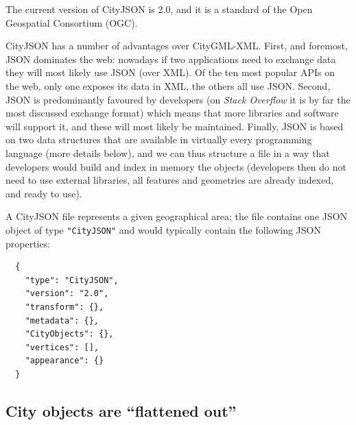 %

The current version of CityJSON is 2.0, and it is a standard of the Open Geospatial Consortium (OGC).

%

CityJSON has a number of advantages over CityGML-XML\@.
First, and foremost, JSON dominates the web: nowadays if two applications need to exchange data they will most likely use JSON (over XML).
Of the ten most popular APIs on the web, only one exposes its data in XML, the others all use JSON\@.
Second, JSON is predominantly favoured by developers (on \emph{Stack Overflow} it is by far the most discussed exchange format) which means that more libraries and software will support it, and these will most likely be maintained.
Finally, JSON is based on two data structures that are available in virtually every programming language (more details below), and we can thus structure a file in a way that  developers would build and index in memory the objects (developers then do not need to use external libraries, all features and geometries are already indexed, and ready to use). 

%

A CityJSON file represents a given geographical area; the file contains one JSON object of type \texttt{"CityJSON"} and would typically contain the following JSON properties:
\begin{lstlisting}
  {
    "type": "CityJSON",
    "version": "2.0",
    "transform": {},
    "metadata": {},
    "CityObjects": {},
    "vertices": [],
    "appearance": {}
  }
\end{lstlisting}


\subsection{City objects are ``flattened out''}

